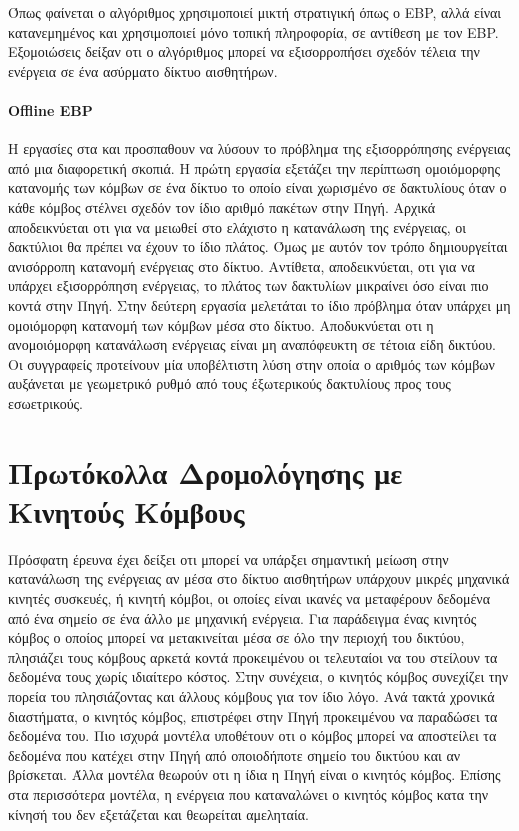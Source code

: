 Όπως φαίνεται ο αλγόριθμος χρησιμοποιεί μικτή στρατιγική όπως ο EBP, αλλά είναι κατανεμημένος και χρησιμοποιεί μόνο τοπική πληροφορία, σε αντίθεση με τον EBP.
Εξομοιώσεις δείξαν οτι ο αλγόριθμος μπορεί να εξισορροπήσει σχεδόν τέλεια την ενέργεια σε ένα ασύρματο δίκτυο αισθητήρων.

\paragraph{Offline EBP} H εργασίες στα \cite{oebp_protocol1} και \cite{oebp_protocol2} προσπαθουν να λύσουν το πρόβλημα της εξισορρόπησης ενέργειας από μια
διαφορετική σκοπιά. Η πρώτη εργασία εξετάζει την περίπτωση ομοιόμορφης κατανομής των κόμβων σε ένα δίκτυο το οποίο είναι χωρισμένο σε δακτυλίους όταν ο κάθε κόμβος
στέλνει σχεδόν τον ίδιο αριθμό πακέτων στην Πηγή. Αρχικά αποδεικνύεται οτι για να μειωθεί στο ελάχιστο η κατανάλωση της ενέργειας, οι δακτύλιοι θα πρέπει να έχουν το
ίδιο πλάτος. Όμως με αυτόν τον τρόπο δημιουργείται ανισόρροπη κατανομή ενέργειας στο δίκτυο. Αντίθετα, αποδεικνύεται, οτι για να υπάρχει εξισορρόπηση ενέργειας, το
πλάτος των δακτυλίων μικραίνει όσο είναι πιο κοντά στην Πηγή. Στην δεύτερη εργασία μελετάται το ίδιο πρόβλημα όταν υπάρχει μη ομοιόμορφη κατανομή των κόμβων μέσα στο
δίκτυο. Αποδυκνύεται οτι η ανομοιόμορφη κατανάλωση ενέργειας είναι μη αναπόφευκτη σε τέτοια είδη δικτύου. Οι συγγραφείς προτείνουν μία υποβέλτιστη λύση στην οποία ο
αριθμός των κόμβων αυξάνεται με γεωμετρικό ρυθμό από τους έξωτερικούς δακτυλίους προς τους εσωετρικούς.


\section{Πρωτόκολλα Δρομολόγησης με Κινητούς Κόμβους}
Πρόσφατη έρευνα έχει δείξει οτι μπορεί να υπάρξει σημαντική μείωση στην κατανάλωση της ενέργειας αν μέσα στο δίκτυο αισθητήρων υπάρχουν μικρές μηχανικά κινητές
συσκευές, ή κινητή κόμβοι, οι οποίες είναι ικανές να μεταφέρουν δεδομένα από ένα σημείο σε ένα άλλο με μηχανική ενέργεια. Για παράδειγμα ένας κινητός κόμβος ο οποίος
μπορεί να μετακινείται μέσα σε όλο την περιοχή του δικτύου, πλησιάζει τους κόμβους αρκετά κοντά προκειμένου οι τελευταίοι να του στείλουν τα δεδομένα τους χωρίς
ιδιαίτερο κόστος. Στην συνέχεια, ο κινητός κόμβος συνεχίζει την πορεία του πλησιάζοντας και άλλους κόμβους για τον ίδιο λόγο. Ανά τακτά χρονικά διαστήματα, ο
κινητός κόμβος, επιστρέφει στην Πηγή προκειμένου να παραδώσει τα δεδομένα του. Πιο ισχυρά μοντέλα υποθέτουν οτι ο κόμβος μπορεί να αποστείλει τα δεδομένα που κατέχει
στην Πηγή από οποιοδήποτε σημείο του δικτύου και αν βρίσκεται. Άλλα μοντέλα θεωρούν οτι η ίδια η Πηγή είναι ο κινητός κόμβος. Επίσης στα περισσότερα μοντέλα, η
ενέργεια που καταναλώνει ο κινητός κόμβος κατα την κίνησή του δεν εξετάζεται και θεωρείται αμεληταία.

